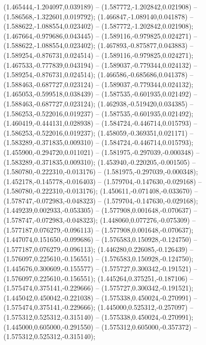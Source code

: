  (1.465444,-1.204097,0.039189) -- (1.587772,-1.202842,0.021908) -- (1.586568,-1.322601,0.019792);
 (1.466847,-1.089140,0.041878) -- (1.588622,-1.088554,0.023402) -- (1.587772,-1.202842,0.021908);
 (1.467664,-0.979686,0.043445) -- (1.589116,-0.979825,0.024271) -- (1.588622,-1.088554,0.023402);
 (1.467893,-0.875877,0.043883) -- (1.589254,-0.876731,0.024514) -- (1.589116,-0.979825,0.024271);
 (1.467533,-0.777839,0.043194) -- (1.589037,-0.779344,0.024132) -- (1.589254,-0.876731,0.024514);
 (1.466586,-0.685686,0.041378) -- (1.588463,-0.687727,0.023124) -- (1.589037,-0.779344,0.024132);
 (1.465053,-0.599518,0.038439) -- (1.587535,-0.601935,0.021492) -- (1.588463,-0.687727,0.023124);
 (1.462938,-0.519420,0.034385) -- (1.586253,-0.522016,0.019237) -- (1.587535,-0.601935,0.021492);
 (1.460419,-0.444131,0.028938) -- (1.584724,-0.446714,0.015793) -- (1.586253,-0.522016,0.019237);
 (1.458059,-0.369351,0.021171) -- (1.583289,-0.371835,0.009310) -- (1.584724,-0.446714,0.015793);
 (1.455900,-0.294720,0.011021) -- (1.581975,-0.297039,-0.000348) -- (1.583289,-0.371835,0.009310);
 (1.453940,-0.220205,-0.001505) -- (1.580780,-0.222310,-0.013176) -- (1.581975,-0.297039,-0.000348);
 (1.452178,-0.145778,-0.016403) -- (1.579704,-0.147630,-0.029168) -- (1.580780,-0.222310,-0.013176);
 (1.450611,-0.071408,-0.033670) -- (1.578747,-0.072983,-0.048323) -- (1.579704,-0.147630,-0.029168);
 (1.449239,0.002933,-0.053305) -- (1.577908,0.001648,-0.070637) -- (1.578747,-0.072983,-0.048323);
 (1.448060,0.077276,-0.075309) -- (1.577187,0.076279,-0.096113) -- (1.577908,0.001648,-0.070637);
 (1.447074,0.151650,-0.099686) -- (1.576583,0.150928,-0.124750) -- (1.577187,0.076279,-0.096113);
 (1.446280,0.226085,-0.126439) -- (1.576097,0.225610,-0.156551) -- (1.576583,0.150928,-0.124750);
 (1.445676,0.300609,-0.155577) -- (1.575727,0.300342,-0.191521) -- (1.576097,0.225610,-0.156551);
 (1.445264,0.375251,-0.187106) -- (1.575474,0.375141,-0.229666) -- (1.575727,0.300342,-0.191521);
 (1.445042,0.450042,-0.221038) -- (1.575338,0.450024,-0.270991) -- (1.575474,0.375141,-0.229666);
 (1.445000,0.525312,-0.257097) -- (1.575312,0.525312,-0.315140) -- (1.575338,0.450024,-0.270991);
 (1.445000,0.605000,-0.291550) -- (1.575312,0.605000,-0.357372) -- (1.575312,0.525312,-0.315140);
